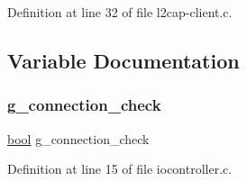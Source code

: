 Definition at line 32 of file l2cap-\/client.\+c.



\subsection{Variable Documentation}
\mbox{\label{piconet_2l2cap-client_8c_a81bc6941c354c1be6ad9931b4f2b50bf}} 
\subsubsection{\texorpdfstring{g\+\_\+connection\+\_\+check}{g\_connection\_check}}
{\footnotesize\ttfamily \mbox{\hyperlink{piconet_2l2cap-client_8c_af6a258d8f3ee5206d682d799316314b1}{bool}} g\+\_\+connection\+\_\+check}



Definition at line 15 of file iocontroller.\+c.

